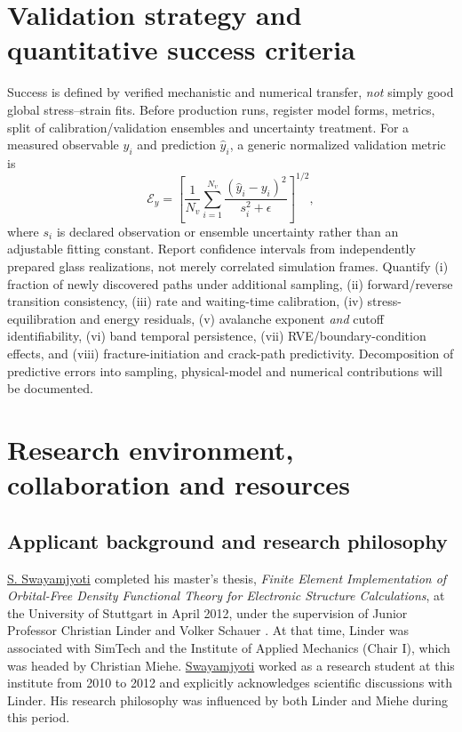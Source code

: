 \documentclass[11pt,a4paper]{article}
\begin{document}
\section{Validation strategy and quantitative success criteria}
Success is defined by verified mechanistic and numerical transfer, \emph{not} simply good global stress--strain fits. Before production runs, register model forms, metrics, split of calibration/validation ensembles and uncertainty treatment. For a measured observable $y_i$ and prediction $\widehat y_i$, a generic normalized validation metric is
\begin{equation}
 \mathcal E_y=\left[\frac{1}{N_v}\sum_{i=1}^{N_v}
 \frac{(\widehat y_i-y_i)^2}{s_i^2+\epsilon}\right]^{1/2},\label{eq:validation}
\end{equation}
where $s_i$ is declared observation or ensemble uncertainty rather than an adjustable fitting constant. Report confidence intervals from independently prepared glass realizations, not merely correlated simulation frames. Quantify (i) fraction of newly discovered paths under additional sampling, (ii) forward/reverse transition consistency, (iii) rate and waiting-time calibration, (iv) stress-equilibration and energy residuals, (v) avalanche exponent \emph{and} cutoff identifiability, (vi) band temporal persistence, (vii) RVE/boundary-condition effects, and (viii) fracture-initiation and crack-path predictivity. Decomposition of predictive errors into sampling, physical-model and numerical contributions will be documented.

\section{Research environment, collaboration and resources}
\subsection{Applicant background and research philosophy}
\underline{S. Swayamjyoti} completed his master's thesis, \emph{Finite Element Implementation of Orbital-Free Density Functional Theory for Electronic Structure Calculations}, at the University of Stuttgart in April 2012, under the supervision of Junior Professor Christian Linder and Volker Schauer \cite{swaymaster2012}. At that time, Linder was associated with SimTech and the Institute of Applied Mechanics (Chair I), which was headed by Christian Miehe. \underline{Swayamjyoti} worked as a research student at this institute from 2010 to 2012 and explicitly acknowledges scientific discussions with Linder. His research philosophy was influenced by both Linder and Miehe during this period.
\end{document}
